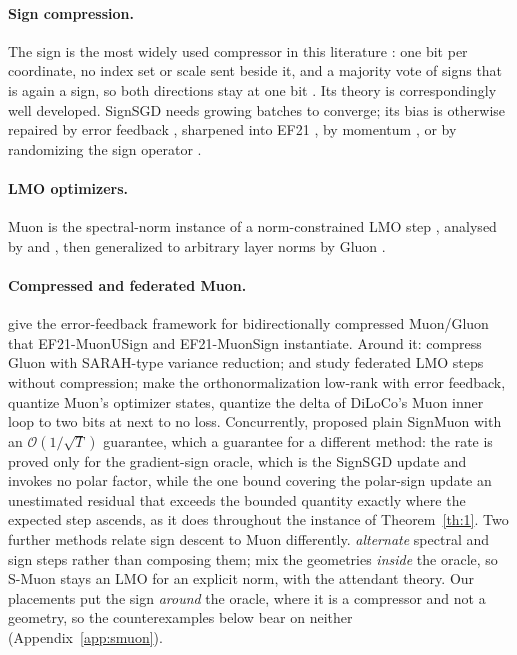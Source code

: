 \paragraph{Sign compression.} The sign is the most widely used compressor in this literature \citep{alistarh2017qsgd,horvath2023stochastic,beznosikov2020biased}: one bit per coordinate, no index set or scale sent beside it, and a majority vote of signs that is again a sign, so both directions stay at one bit \citep{bernstein2019signsgdmajority}. Its theory is correspondingly well developed. SignSGD \citep{bernstein2018signsgd} needs growing batches to converge; its bias is otherwise repaired by error feedback \citep{seide20141bit,karimireddy2019efsign}, sharpened into EF21 \citep{richtarik2021ef21}, by momentum \citep{cutkosky2020momentum,sun2023signmomentum}, or by randomizing the sign operator \citep{chen2020median,safaryan2021ssdm,jin2024stosign}.

\paragraph{LMO optimizers.} Muon \citep{jordan2024muon} is the spectral-norm instance of a norm-constrained LMO step \citep{bernstein2024old,pethick2025training}, analysed by \citet{li2025note} and \citet{kovalev2025understanding}, then generalized to arbitrary layer norms by Gluon \citep{riabinin2025gluon}.

\paragraph{Compressed and federated Muon.} \citet{gruntkowska2025error} give the error-feedback framework for bidirectionally compressed Muon/Gluon that EF21-MuonUSign and EF21-MuonSign instantiate. Around it: \citet{qian2026communicationefficientgluon} compress Gluon with SARAH-type variance reduction; \citet{takezawa2025fedmuonfederatedlearningbiascorrected} and \citet{zhang2025fedmuon} study federated LMO steps without compression; \citet{ahn2025dion} make the orthonormalization low-rank with error feedback, \citet{gupta2025effective} quantize Muon's optimizer states, \citet{therien2025muloco} quantize the delta of DiLoCo's Muon inner loop \citep{douillard2024diloco} to two bits at next to no loss. Concurrently, \citet{mishra2026signmuon} proposed plain SignMuon with an $\mathcal{O}(1/\sqrt{T})$ guarantee, which  a guarantee for a different method: the rate is proved only for the gradient-sign oracle, which is the SignSGD update and invokes no polar factor, while the one bound covering the polar-sign update  an unestimated residual that exceeds the bounded quantity exactly where the expected step ascends, as it does throughout the instance of Theorem~\ref{th:1}. Two further methods relate sign descent to Muon differently. \citet{bolatov2026lionmuon} \emph{alternate} spectral and sign steps rather than composing them; \citet{kravatskiy2025kyfannorms} mix the geometries \emph{inside} the oracle, so S-Muon stays an LMO for an explicit norm, with the attendant theory. Our placements put the sign \emph{around} the oracle, where it is a compressor and not a geometry, so the counterexamples below bear on neither (Appendix~\ref{app:smuon}).

